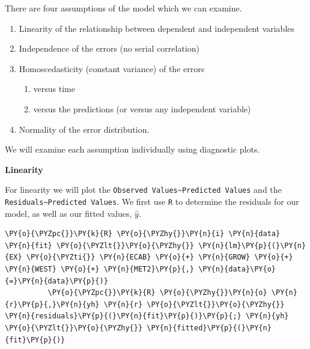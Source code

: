 \documentclass[10pt]{article}\usepackage[]{graphicx}\usepackage[]{xcolor}
\begin{document}
    There are four assumptions of the model which we can examine.

\begin{enumerate}
\def\labelenumi{\arabic{enumi}.}
\itemsep1pt\parskip0pt
\item
  Linearity of the relationship between dependent and independent
  variables
\item
  Independence of the errors (no serial correlation)
\item
  Homoscedasticity (constant variance) of the errors

  \begin{enumerate}
  \def\labelenumii{\arabic{enumii}.}
  \itemsep1pt\parskip0pt
  \item
    versus time
  \item
    versus the predictions (or versus any independent variable)
  \end{enumerate}
\item
  Normality of the error distribution.
\end{enumerate}

We will examine each assumption individually using diagnostic plots.

\textbf{Linearity}

For linearity we will plot the
\texttt{Observed Values\textasciitilde{}Predicted Values} and the
\texttt{Residuals\textasciitilde{}Predicted Values}. We first use
\texttt{R} to determine the residuals for our model, as well as our
fitted values, $\hat{y}$.

    \begin{Verbatim}[commandchars=\\\{\}]
 \PY{o}{\PYZpc{}}\PY{k}{R} \PY{o}{\PYZhy{}}\PY{n}{i} \PY{n}{data} \PY{n}{fit} \PY{o}{\PYZlt{}}\PY{o}{\PYZhy{}} \PY{n}{lm}\PY{p}{(}\PY{n}{EX} \PY{o}{\PYZti{}} \PY{n}{ECAB} \PY{o}{+} \PY{n}{GROW} \PY{o}{+} \PY{n}{WEST} \PY{o}{+} \PY{n}{MET2}\PY{p}{,} \PY{n}{data}\PY{o}{=}\PY{n}{data}\PY{p}{)}
          \PY{o}{\PYZpc{}}\PY{k}{R} \PY{o}{\PYZhy{}}\PY{n}{o} \PY{n}{r}\PY{p}{,}\PY{n}{yh} \PY{n}{r} \PY{o}{\PYZlt{}}\PY{o}{\PYZhy{}} \PY{n}{residuals}\PY{p}{(}\PY{n}{fit}\PY{p}{)}\PY{p}{;} \PY{n}{yh} \PY{o}{\PYZlt{}}\PY{o}{\PYZhy{}} \PY{n}{fitted}\PY{p}{(}\PY{n}{fit}\PY{p}{)}
\end{Verbatim}
\end{document}
